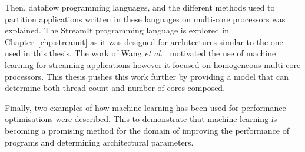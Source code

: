 Then, dataflow programming languages, and the different methods used to partition applications written in these languages on multi-core processors was explained.
The StreamIt programming language is explored in Chapter~\ref{chp:streamit} as it was designed for architectures similar to the one used in this thesis.
The work of Wang {\it et al.~}\cite{wang2013partitionstreamit} motivated the use of machine learning for streaming applications however it focused on homogeneous multi-core processors.
This thesis pushes this work further by providing a model that can determine both thread count and number of cores composed.

Finally, two examples of how machine learning has been used for performance optimisations were described.
This to demonstrate that machine learning is becoming a promising method for the domain of improving the performance of programs and determining architectural parameters.

